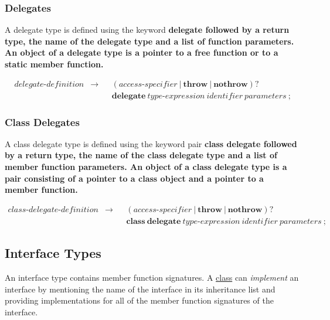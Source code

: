 \documentclass[a4paper,oneside,11pt]{article}
\begin{document}
\subsubsection{Delegates}\label{delegatedefinition}

A delegate type is defined using the keyword \bf{delegate} followed by a return type, the name of the delegate type and a
list of function parameters.
An object of a delegate type is a pointer to a free function or to a static member function.

\begin{align*}
delegate\textrm{-}definition &\rightarrow & &(\hyperref[accessspecifier]{access\textrm{-}specifier} \> | \> \textbf{throw} \> | \> \textbf{nothrow})?\\
& & &\textbf{delegate} \> \hyperref[typeexpr]{type\textrm{-}expression} \> \hyperref[identifier]{identifier} \> \hyperref[parameters]{parameters} \> \texttt{;}
\end{align*}

\subsubsection{Class Delegates}\label{classdelegatedefinition}

A class delegate type is defined using the keyword pair \bf{class} \bf{delegate} followed by a return type, the name of the
class delegate type and a list of member function parameters.
An object of a class delegate type is a pair consisting of a pointer to a class object and a pointer to a member function.

\begin{align*}
class\textrm{-}delegate\textrm{-}definition &\rightarrow & &(\hyperref[accessspecifier]{access\textrm{-}specifier} \> | \> \textbf{throw} \> | \> \textbf{nothrow})?\\
& & &\textbf{class} \> \textbf{delegate} \> \hyperref[typeexpr]{type\textrm{-}expression} \> \hyperref[identifier]{identifier} \>
\hyperref[parameters]{parameters} \> \texttt{;}
\end{align*}

\subsection{Interface Types}\label{interface}

An interface type contains member function signatures.
A \hyperref[classtypes]{class} can \emph{implement} an interface by mentioning the name of the interface in its inheritance list and
providing implementations for all of the member function signatures of the interface.
\end{document}
